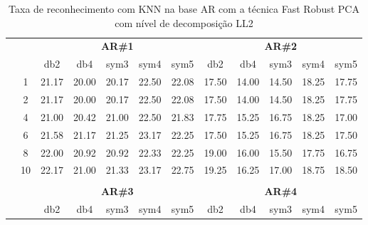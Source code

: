 \begin{table}[H]
	\centering
    \normalsize
	\caption{Taxa de reconhecimento com KNN na base AR com a técnica Fast Robust PCA com nível de decomposição LL2}
	\begin{tabular}{|c|c|c c c c c|c c c c c|}
\cline{3-12}
\multicolumn{2}{c|}{\multirow{2}{*}{}} & \multicolumn{5}{c|}{\textbf{AR\#1}}  & \multicolumn{5}{c|}{\textbf{AR\#2}} \\\cline{3-12}

\multicolumn{2}{c|}{}  & db2 & db4 & sym3 & sym4 & sym5 & db2 & db4& sym3 & sym4 & sym5 \\\hline

\multicolumn{1}{|c|}{ \multirow{5}{*}{\rotatebox[origin=c]{90}{\textbf{K-vizinhos}}} }
&1	&21.17	&20.00	&20.17	&22.50	&22.08	&17.50	&14.00	&14.50	&18.25   &17.75\\\cline{2-12}
&2	&21.17	&20.00	&20.17	&22.50	&22.08	&17.50	&14.00	&14.50	&18.25   &17.75\\\cline{2-12}
&4	&21.00	&20.42	&21.00	&22.50	&21.83	&17.75	&15.25	&16.75	&18.25   &17.00\\\cline{2-12}
&6	&21.58	&21.17	&21.25	&23.17	&22.25	&17.50	&15.25	&16.75	&18.25   &17.50\\\cline{2-12}
&8	&22.00	&20.92	&20.92	&22.33	&22.25	&19.00	&16.00	&15.50	&17.75   &16.75\\\cline{2-12}
&10	&22.17	&21.00	&21.33	&23.17	&22.75	&19.25	&16.25	&17.00	&18.75   &18.50%



\\ \midrule
\multicolumn{12}{c}{}\\ 

\cline{3-12}
\multicolumn{2}{c}{} & \multicolumn{5}{|c|}{\textbf{AR\#3}}  & \multicolumn{5}{c|}{\textbf{AR\#4}} \\\cline{3-12}
\multicolumn{2}{c}{}  & \multicolumn{1}{|c}{db2} & db4 & sym3 & sym4 & sym5 & db2 & db4& sym3 & sym4 & sym5 \\\hline


\end{tabular}
\end{table}
